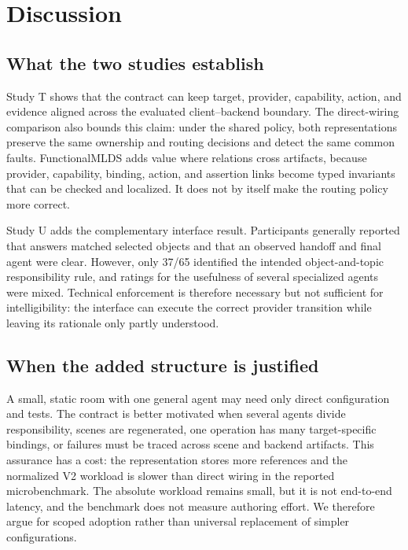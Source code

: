\section{Discussion}
\label{sec:discussion}

\subsection{What the two studies establish}

Study T shows that the contract can keep target, provider, capability, action,
and evidence aligned across the evaluated client--backend boundary.  The
direct-wiring comparison also bounds this claim: under the shared policy, both
representations preserve the same ownership and routing decisions and detect
the same common faults.  FunctionalMLDS adds value where relations cross
artifacts, because provider, capability, binding, action, and assertion links
become typed invariants that can be checked and localized.  It does not by
itself make the routing policy more correct.

Study U adds the complementary interface result.  Participants generally
reported that answers matched selected objects and that an observed handoff and
final agent were clear.  However, only 37/65 identified the intended
object-and-topic responsibility rule, and ratings for the usefulness of several
specialized agents were mixed.  Technical enforcement is therefore necessary
but not sufficient for intelligibility: the interface can execute the correct
provider transition while leaving its rationale only partly understood.

\subsection{When the added structure is justified}

A small, static room with one general agent may need only direct configuration
and tests.  The contract is better motivated when several agents divide
responsibility, scenes are regenerated, one operation has many target-specific
bindings, or failures must be traced across scene and backend artifacts.  This
assurance has a cost: the representation stores more references and the
normalized V2 workload is slower than direct wiring in the reported
microbenchmark.  The absolute workload remains small, but it is not end-to-end
latency, and the benchmark does not measure authoring effort.  We therefore
argue for scoped adoption rather than universal replacement of simpler
configurations.

